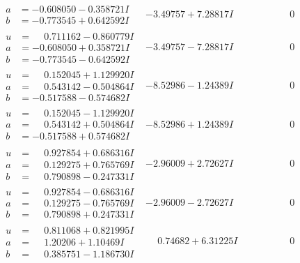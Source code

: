 \documentclass[1p]{elsarticle_modified}
\theoremstyle{definition}
\begin{document}
$$\begin{array}{c|c|c}
\begin{aligned}
a &= -0.608050 - 0.358721 I \\
b &= -0.773545 + 0.642592 I\end{aligned}
 & -3.49757 + 7.28817 I & \phantom{-0.000000 } 0 \\ \hline\begin{aligned}
u &= \phantom{-}0.711162 - 0.860779 I \\
a &= -0.608050 + 0.358721 I \\
b &= -0.773545 - 0.642592 I\end{aligned}
 & -3.49757 - 7.28817 I & \phantom{-0.000000 } 0 \\ \hline\begin{aligned}
u &= \phantom{-}0.152045 + 1.129920 I \\
a &= \phantom{-}0.543142 - 0.504864 I \\
b &= -0.517588 - 0.574682 I\end{aligned}
 & -8.52986 - 1.24389 I & \phantom{-0.000000 } 0 \\ \hline\begin{aligned}
u &= \phantom{-}0.152045 - 1.129920 I \\
a &= \phantom{-}0.543142 + 0.504864 I \\
b &= -0.517588 + 0.574682 I\end{aligned}
 & -8.52986 + 1.24389 I & \phantom{-0.000000 } 0 \\ \hline\begin{aligned}
u &= \phantom{-}0.927854 + 0.686316 I \\
a &= \phantom{-}0.129275 + 0.765769 I \\
b &= \phantom{-}0.790898 - 0.247331 I\end{aligned}
 & -2.96009 + 2.72627 I & \phantom{-0.000000 } 0 \\ \hline\begin{aligned}
u &= \phantom{-}0.927854 - 0.686316 I \\
a &= \phantom{-}0.129275 - 0.765769 I \\
b &= \phantom{-}0.790898 + 0.247331 I\end{aligned}
 & -2.96009 - 2.72627 I & \phantom{-0.000000 } 0 \\ \hline\begin{aligned}
u &= \phantom{-}0.811068 + 0.821995 I \\
a &= \phantom{-}1.20206 + 1.10469 I \\
b &= \phantom{-}0.385751 - 1.186730 I\end{aligned}
 & \phantom{-}0.74682 + 6.31225 I & \phantom{-0.000000 } 0 \\ \hline\begin{aligned}

\end{aligned}
\end{array}$$
\end{document}
